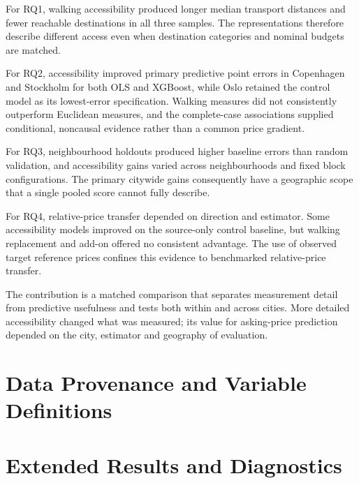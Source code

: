 \documentclass[11pt,a4paper,oneside,openany]{memoir}
\begin{document}
For RQ1, walking accessibility produced longer median transport distances and
fewer reachable destinations in all three samples. The representations
therefore describe different access even when destination categories and
nominal budgets are matched.

For RQ2, accessibility improved primary predictive point errors in Copenhagen
and Stockholm for both OLS and XGBoost, while Oslo retained the control model
as its lowest-error specification. Walking measures did not consistently
outperform Euclidean measures, and the complete-case associations supplied
conditional, noncausal evidence rather than a common price gradient.

For RQ3, neighbourhood holdouts produced higher baseline errors than random
validation, and accessibility gains varied across neighbourhoods and fixed
block configurations. The primary citywide gains consequently have a
geographic scope that a single pooled score cannot fully describe.

For RQ4, relative-price transfer depended on direction and estimator. Some
accessibility models improved on the source-only control baseline, but walking
replacement and add-on offered no consistent advantage. The use of observed
target reference prices confines this evidence to benchmarked relative-price
transfer.

The contribution is a matched comparison that separates measurement detail
from predictive usefulness and tests both within and across cities. More
detailed accessibility changed what was measured; its value for asking-price
prediction depended on the city, estimator and geography of evaluation.

\appendix
\chapter{Data Provenance and Variable Definitions}
\label{app:definitions}

\chapter{Extended Results and Diagnostics}
\label{app:extended-results}
\end{document}
